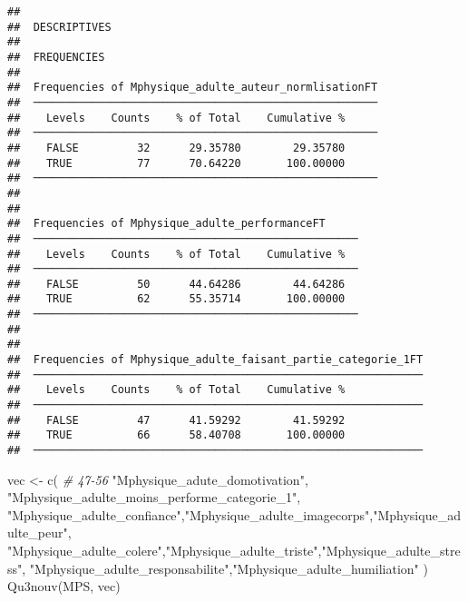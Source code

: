 \documentclass[
]{article}
\newenvironment{Shaded}{\begin{snugshade}}{\end{snugshade}}
\newcommand{\CommentTok}[1]{\textcolor[rgb]{0.56,0.35,0.01}{\textit{#1}}}
\newcommand{\FunctionTok}[1]{\textcolor[rgb]{0.00,0.00,0.00}{#1}}
\newcommand{\NormalTok}[1]{#1}
\newcommand{\OtherTok}[1]{\textcolor[rgb]{0.56,0.35,0.01}{#1}}
\newcommand{\StringTok}[1]{\textcolor[rgb]{0.31,0.60,0.02}{#1}}
\begin{document}
\begin{verbatim}
## 
##  DESCRIPTIVES
## 
##  FREQUENCIES
## 
##  Frequencies of Mphysique_adulte_auteur_normlisationFT 
##  ───────────────────────────────────────────────────── 
##    Levels    Counts    % of Total    Cumulative %   
##  ───────────────────────────────────────────────────── 
##    FALSE         32      29.35780        29.35780   
##    TRUE          77      70.64220       100.00000   
##  ───────────────────────────────────────────────────── 
## 
## 
##  Frequencies of Mphysique_adulte_performanceFT      
##  ────────────────────────────────────────────────── 
##    Levels    Counts    % of Total    Cumulative %   
##  ────────────────────────────────────────────────── 
##    FALSE         50      44.64286        44.64286   
##    TRUE          62      55.35714       100.00000   
##  ────────────────────────────────────────────────── 
## 
## 
##  Frequencies of Mphysique_adulte_faisant_partie_categorie_1FT 
##  ──────────────────────────────────────────────────────────── 
##    Levels    Counts    % of Total    Cumulative %   
##  ──────────────────────────────────────────────────────────── 
##    FALSE         47      41.59292        41.59292   
##    TRUE          66      58.40708       100.00000   
##  ────────────────────────────────────────────────────────────
\end{verbatim}

\begin{Shaded}
\begin{Highlighting}[]
\NormalTok{vec }\OtherTok{\textless{}{-}} \FunctionTok{c}\NormalTok{(   }\CommentTok{\# 47{-}56}
  \StringTok{"Mphysique\_adute\_domotivation"}\NormalTok{,}
  \StringTok{"Mphysique\_adulte\_moins\_performe\_categorie\_1"}\NormalTok{,}
  \StringTok{"Mphysique\_adulte\_confiance"}\NormalTok{,}\StringTok{"Mphysique\_adulte\_imagecorps"}\NormalTok{,}\StringTok{"Mphysique\_adulte\_peur"}\NormalTok{,}
  \StringTok{"Mphysique\_adulte\_colere"}\NormalTok{,}\StringTok{"Mphysique\_adulte\_triste"}\NormalTok{,}\StringTok{"Mphysique\_adulte\_stress"}\NormalTok{,}
  \StringTok{"Mphysique\_adulte\_responsabilite"}\NormalTok{,}\StringTok{"Mphysique\_adulte\_humiliation"}
\NormalTok{     )}
\FunctionTok{Qu3nouv}\NormalTok{(MPS, vec)}
\end{Highlighting}
\end{Shaded}
\end{document}
